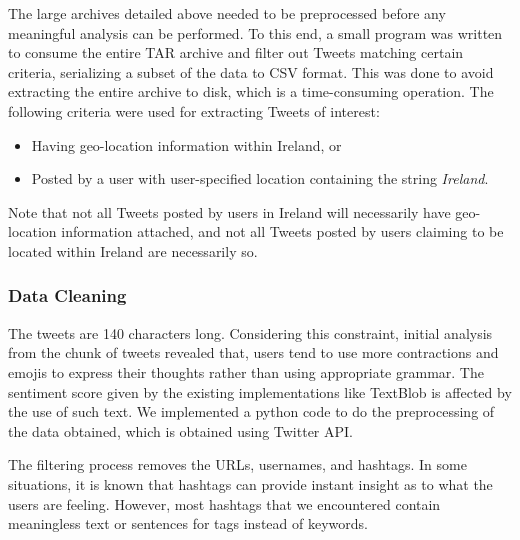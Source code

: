 \documentclass[a4paper,10pt]{article}
\begin{document}
    The large archives detailed above needed to be preprocessed before any meaningful analysis can be performed. To this end, a small program was written to consume the entire TAR archive and filter out Tweets matching certain criteria, serializing a subset of the data to CSV format. This was done to avoid extracting the entire archive to disk, which is a time-consuming operation. The following criteria were used for extracting Tweets of interest:
    \begin{itemize}
        \item{
            Having geo-location information within Ireland, or
        }
        \item{
            Posted by a user with user-specified location containing the string \textit{Ireland}.
        }
    \end{itemize}

    Note that not all Tweets posted by users in Ireland will necessarily have geo-location information attached, and not all Tweets posted by users claiming to be located within Ireland are necessarily so.

    \subsubsection{Data Cleaning}

    The tweets are 140 characters long. Considering this constraint, initial analysis from the chunk of tweets revealed that, users tend to use more contractions and emojis to express their thoughts rather than using appropriate grammar. The sentiment score given by the existing implementations like TextBlob is affected by the use of such text. We implemented a python code to do the preprocessing of the data obtained, which is obtained using Twitter API.

    The filtering process removes the URLs, usernames, and hashtags. In some situations, it is known that hashtags can provide instant insight as to what the users are feeling. However, most hashtags that we encountered contain meaningless text or sentences for tags instead of keywords.

\end{document}
